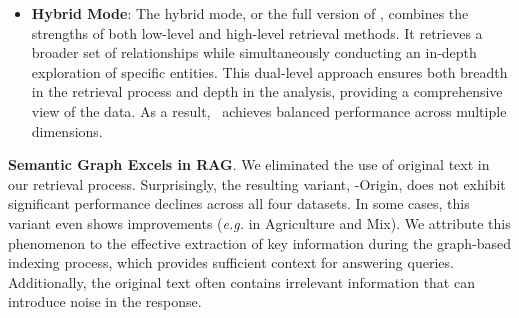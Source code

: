 \begin{itemize}[leftmargin=*]
    \item \textbf{Hybrid Mode}: The hybrid mode, or the full version of \model, combines the strengths of both low-level and high-level retrieval methods. It retrieves a broader set of relationships while simultaneously conducting an in-depth exploration of specific entities. This dual-level approach ensures both breadth in the retrieval process and depth in the analysis, providing a comprehensive view of the data. As a result, \model\ achieves balanced performance across multiple dimensions.
    
\end{itemize}

\textbf{Semantic Graph Excels in RAG}.
We eliminated the use of original text in our retrieval process. Surprisingly, the resulting variant, -Origin, does not exhibit significant performance declines across all four datasets. In some cases, this variant even shows improvements (\textit{e.g.} in Agriculture and Mix). We attribute this phenomenon to the effective extraction of key information during the graph-based indexing process, which provides sufficient context for answering queries. Additionally, the original text often contains irrelevant information that can introduce noise in the response.

